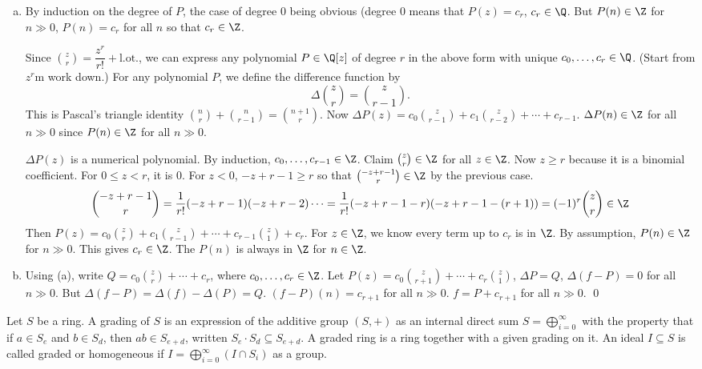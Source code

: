 \pf \hfill

\begin{enumerate}[(a)]
\item By induction on the degree of $P$, the case of degree 0 being obvious (degree $0$ means that $P(z)= c_r$, $c_r \in \Q$. But $P(n) \in \Z$ for $n \gg 0$, $P(n)= c_r$ for all $n$ so that $c_r \in \Z$. 

Since $\binom{z}{r}= \dfrac{z^r}{r!} + \text{l.ot.}$, we can express any polynomial $P \in \Q[z]$ of degree $r$ in the above form with unique $c_0,\ldots,c_r \in \Q$. (Start from $z^r$m work down.) For any polynomial $P$, we define the difference function by
	\[
	\Delta \binom{z}{r}= \binom{z}{r-1}.
	\]
This is Pascal's triangle identity $\binom{n}{r} + \binom{n}{r-1}= \binom{n+1}{r}$. Now $\Delta P(z)= c_0 \binom{z}{r-1} + c_1 \binom{z}{r-2} + \cdots + c_{r-1}$. $\Delta P(n) \in \Z$ for all $n \gg 0$ since $P(n) \in \Z$ for all $n \gg 0$. 

$\Delta P(z)$ is a numerical polynomial. By induction, $c_0, \ldots, c_{r-1} \in \Z$. Claim $\binom{z}{r} \in \Z$ for all $z \in \Z$. Now $z \geq r$ because it is a binomial coefficient. For $0 \leq z < r$, it is 0. For $z<0$, $-z+r-1 \geq r$ so that $\binom{-z+r-1}{r} \in \Z$ by the previous case. 
	\[
	\binom{-z+r-1}{r}= \dfrac{1}{r!} (-z+r-1)(-z+r-2) \cdots = \dfrac{1}{r!} (-z+r-1-r)(-z+r -1 -(r+1))= (-1)^r \binom{z}{r} \in \Z
	\]
Then $P(z)= c_0 \binom{z}{r} + c_1 \binom{z}{r-1} + \cdots + c_{r-1} \binom{z}{1} + c_r$. For $z \in \Z$, we know every term up to $c_r$ is in $\Z$. By assumption, $P(n) \in \Z$ for $n \gg 0$. This gives $c_r \in \Z$. The $P(n)$ is always in $\Z$ for $n \in \Z$.

\item Using (a), write $Q= c_0 \binom{z}{r} + \cdots+ c_r$, where $c_0, \ldots, c_r \in \Z$. Let $P(z) = c_0 \binom{z}{r+1} + \cdots + c_r \binom{z}{1}$, $\Delta P= Q$, $\Delta(f-P)=0$ for all $n \gg 0$. But $\Delta(f-P)= \Delta(f) - \Delta(P)= Q$. $(f-P)(n)= c_{r+1}$ for all $n \gg 0$. $f= P+ c_{r+1}$ for all $n \gg 0$. \qed 
\end{enumerate}


\begin{dfn}
Let $S$ be a ring. A grading of $S$ is an expression of the additive group $(S,+)$ as an internal direct sum $S= \bigoplus_{i=0}^\infty$ with the property that if $a \in S_e$ and $b \in S_d$, then $ab \in S_{e+d}$, written $S_e \cdot S_d \subseteq S_{e+d}$. A graded ring is a ring together with a given grading on it. An ideal $I \subseteq S$ is called graded or homogeneous if $I= \bigoplus_{i=0}^\infty (I \cap S_i)$ as a group. 
\end{dfn}


